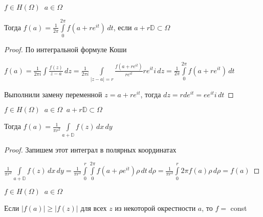 
\begin{theorem}[о среднем]\thmslashn
	
	$f \in H(\Omega) \;\; a\in \Omega$
	
	Тогда $f(a) = \frac{1}{2\pi}\int\limits_0^{2\pi} f(a + re^{it})\,dt$, если $a + r\mathbb{D} \subset \Omega$
	
\end{theorem}

\begin{proof}\thmslashn
	
	По интегральной формуле Коши
	
	$f(a) = \frac{1}{2\pi i}\int\frac{f(z)}{z-a}\,dz = \frac{1}{2\pi i}\int\limits_{|z-a| =r} \frac{f(a +re^{it})}{re^{it}} re^{it} i\,dz = \frac{1}{2\pi}\int\limits_0^{2\pi} f(a + re^{it})\,dt$
	
	Выполнили замену переменной $z = a + re^{it}$, тогда $dz = rde^{it} = ee^{it} i \,dt$
	
\end{proof}

\begin{consequence}\thmslashn
	
	$f \in H(\Omega) \;\; a \in \Omega \;\; a + r \mathbb{D} \subset \Omega$
	
	Тогда $f(a) = \frac{1}{\pi r^2} \int\limits_{a + \mathbb{D}} f(z)\,dx\,dy$
	
\end{consequence}

\begin{proof}\thmslashn
	
	Запишем этот интеграл в полярных координатах 
	
	$\frac{1}{\pi r^2} \int\limits_{a + \mathbb{D}} f(z)\,dx\,dy = \frac{1}{\pi r^2} \int\limits_0^r \int\limits_0^{2\pi} f(a + \rho e^{it}) \rho \,dt\,d\rho = \frac{1}{\pi r^2} \int\limits_0^r 2\pi f(a) \rho \,d\rho =  f(a)$
	
\end{proof}

\begin{theorem}\thmslashn
	
	$f \in H(\Omega) \;\; a\in \Omega$
	
	Если $|f(a)| \geqslant |f(z)|$ для всех $z$ из некоторой окрестности $a$, то $f =$ const
	
\end{theorem}

